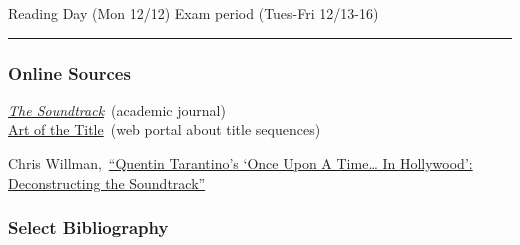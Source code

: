\documentclass[]{tufte-handout}
\begin{document}
Reading Day (Mon 12/12) Exam period (Tues-Fri 12/13-16)

\begin{center}\rule{0.5\linewidth}{0.5pt}\end{center}

\hypertarget{online-sources}{%
\subsubsection{Online Sources}\label{online-sources}}

\href{https://www.intellectbooks.com/the-soundtrack}{\emph{The
Soundtrack}}~(academic journal)\\
\href{https://www.artofthetitle.com/features/}{Art of the Title}~(web
portal about title sequences)

Chris
Willman,~\href{https://variety.com/2019/music/news/quentin-tarantino-music-supervisor-mary-ramos-once-upon-a-time-in-hollywood-1203281034/?fbclid=IwAR3aIzi3Xd1ejRubTOCeaW9gmTzFa90jkNwfita9qNm1o_4O4uDblGNmUag}{``Quentin
Tarantino's `Once Upon A Time\ldots{} In Hollywood': Deconstructing the
Soundtrack''}

\hypertarget{select-bibliography}{%
\subsubsection{Select Bibliography}\label{select-bibliography}}
\end{document}
